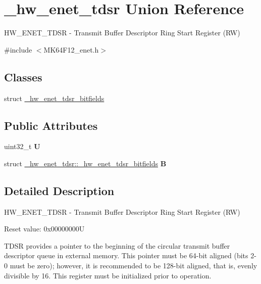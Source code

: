 \hypertarget{union__hw__enet__tdsr}{}\section{\+\_\+hw\+\_\+enet\+\_\+tdsr Union Reference}
\label{union__hw__enet__tdsr}


H\+W\+\_\+\+E\+N\+E\+T\+\_\+\+T\+D\+SR -\/ Transmit Buffer Descriptor Ring Start Register (RW)  




{\ttfamily \#include $<$M\+K64\+F12\+\_\+enet.\+h$>$}

\subsection*{Classes}
\begin{DoxyCompactItemize}
\item 
struct \hyperlink{struct__hw__enet__tdsr_1_1__hw__enet__tdsr__bitfields}{\+\_\+hw\+\_\+enet\+\_\+tdsr\+\_\+bitfields}
\end{DoxyCompactItemize}
\subsection*{Public Attributes}
\begin{DoxyCompactItemize}
\item 
uint32\+\_\+t {\bfseries U}\hypertarget{union__hw__enet__tdsr_aba50c35a65be338b35ecb08485c2fab2}{}\label{union__hw__enet__tdsr_aba50c35a65be338b35ecb08485c2fab2}

\item 
struct \hyperlink{struct__hw__enet__tdsr_1_1__hw__enet__tdsr__bitfields}{\+\_\+hw\+\_\+enet\+\_\+tdsr\+::\+\_\+hw\+\_\+enet\+\_\+tdsr\+\_\+bitfields} {\bfseries B}\hypertarget{union__hw__enet__tdsr_a62263aac7b7dc3f7e9f1a50c5e9c156c}{}\label{union__hw__enet__tdsr_a62263aac7b7dc3f7e9f1a50c5e9c156c}

\end{DoxyCompactItemize}


\subsection{Detailed Description}
H\+W\+\_\+\+E\+N\+E\+T\+\_\+\+T\+D\+SR -\/ Transmit Buffer Descriptor Ring Start Register (RW) 

Reset value\+: 0x00000000U

T\+D\+SR provides a pointer to the beginning of the circular transmit buffer descriptor queue in external memory. This pointer must be 64-\/bit aligned (bits 2-\/0 must be zero); however, it is recommended to be 128-\/bit aligned, that is, evenly divisible by 16. This register must be initialized prior to operation. 

